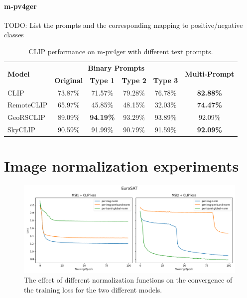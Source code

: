 \documentclass[a4paper, oneside, english]{sapthesis}
\begin{document}
\paragraph{m-pv4ger}

TODO: List the prompts and the corresponding mapping to positive/negative classes


\begin{table}[ht]
\centering
\footnotesize
\renewcommand{\arraystretch}{1.2} %
    \begin{tabular}{lc|cccc}
    \toprule
    \multirow{2}{*}{\textbf{Model}} & \multicolumn{4}{c}{\textbf{Binary Prompts}} &  \multirow{2}{*}{\textbf{Multi-Prompt}}\\
    \cmidrule(lr){2-5}
    & \textbf{Original} & \textbf{Type 1} & \textbf{Type 2} & \textbf{Type 3} \\
    \midrule
    CLIP & 73.87\% & 71.57\% & 79.28\% & 76.78\% & \textbf{82.88\%} \\
    RemoteCLIP & 65.97\% & 45.85\% & 48.15\% & 32.03\% & \textbf{74.47\%} \\
    GeoRSCLIP & 89.09\% & \textbf{94.19\%} & 93.29\% & 93.89\% & 92.09\% \\
    SkyCLIP & 90.59\% & 91.99\% & 90.79\% & 91.59\% & \textbf{92.09\%} \\
    \bottomrule
    \end{tabular}
\vspace{0.3cm}
\caption{\normalsize CLIP performance on m-pv4ger with different text prompts.}
\label{tab:prompts2}
\end{table}


\section{Image normalization experiments}

\begin{figure}[h]
    \centering
    \includegraphics[width=\textwidth]{img/EuroSAT_norm_losses_plot.png}
    \caption{The effect of different normalization functions on the convergence of the training loss for the two different models.}
    \label{fig:normlosses}
\end{figure}
\end{document}
